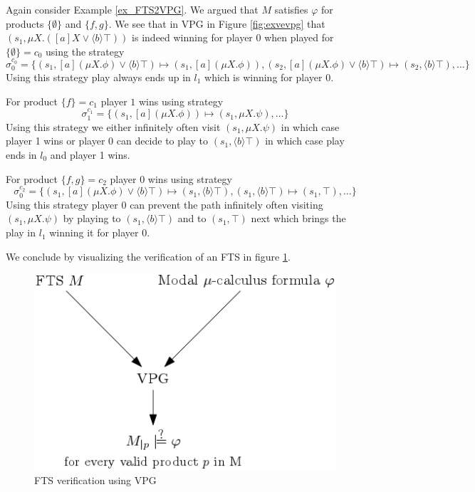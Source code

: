 \begin{example}
	Again consider Example \ref{ex_FTS2VPG}. We argued that $M$ satisfies $\varphi$ for products $\{\emptyset\}$ and $\{f,g\}$. We see that in VPG in Figure \ref{fig:exvevpg} that $(s_1,\mu X.([a]X \vee \langle b \rangle \top))$ is indeed winning for player 0 when played for $\{\emptyset\} = c_0$ using the strategy
	\[ \sigma_0^{c_0} = \{ (s_1,[a](\mu X. \phi) \vee \langle b \rangle \top) \mapsto (s_1,[a](\mu X.\phi)) , (s_2,[a](\mu X.\phi)\vee \langle b \rangle \top) \mapsto (s_2,\langle b \rangle \top ),\dots \}\]
	Using this strategy play always ends up in $l_1$ which is winning for player 0.
	
	For product $\{f\} = c_1$ player $1$ wins using strategy
	\[ \sigma_1^{c_1} = \{ (s_1,[a](\mu X. \phi)) \mapsto (s_1,\mu X.\psi),\dots \}\]
	Using this strategy we either infinitely often visit $(s_1,\mu X.\psi)$ in which case player 1 wins or player 0 can decide to play to $(s_1,\langle b \rangle \top)$ in which case play ends in $l_0$ and player 1 wins.
	
	For product $\{f,g\} = c_2$ player 0 wins using strategy
	\[ \sigma_0^{c_2} = \{ (s_1,[a](\mu X. \phi) \vee \langle b \rangle \top) \mapsto (s_1,\langle b \rangle \top), (s_1, \langle b \rangle \top) \mapsto (s_1,\top),\dots \}\]
	Using this strategy player 0 can prevent the path infinitely often visiting $(s_1,\mu X.\psi)$ by playing to $(s_1,\langle b \rangle \top)$ and to $(s_1,\top)$ next which brings the play in $l_1$ winning it for player 0.
\end{example}

We conclude by visualizing the verification of an FTS in figure \ref{fig:ftsverificationusingvpg}.
\begin{figure}[h]
	\centering
	\includegraphics[scale=0.5]{Diagrams/FTSVerificationUsingVPG}
	\caption[FTS verification using VPG]{FTS verification using VPG}
	\label{fig:ftsverificationusingvpg}
\end{figure}